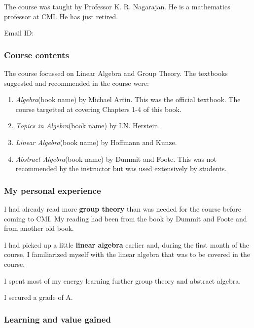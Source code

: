 \documentclass[a4paper]{amsart}
\newcommand{\bookname}[1]{{\em #1}{\small{(book name)}}}
\begin{document}
The course was taught by Professor K. R. Nagarajan. He is a mathematics
professor at CMI. He has just retired.

Email ID: 

\subsubsection{Course contents}

The course focussed on Linear Algebra and Group Theory.  The textbooks
suggested and recommended in the course were:

\begin{enumerate}

\item \bookname{Algebra} by Michael Artin. This was the official textbook.
  The course targetted at covering Chapters 1-4 of this book.

\item \bookname{Topics in Algebra} by I.N. Herstein.

\item \bookname{Linear Algebra} by Hoffmann and Kunze.

\item \bookname{Abstract Algebra} by Dummit and Foote.  This was not recommended
  by the instructor but was used extensively by students.

\end{enumerate}

\subsubsection{My personal experience}

I had already read more {\bf group theory} than was needed for the course 
before coming to CMI. My reading had been from the book by Dummit and Foote
and from another old book.

I had picked up a little {\bf linear algebra} earlier
and, during the first month of the course, I
familiarized myself with 
the linear algebra that was to be covered in the course.

I spent most of my energy learning further group theory and abstract algebra.

I secured a grade of A.

\subsubsection{Learning and value gained}
\end{document}
